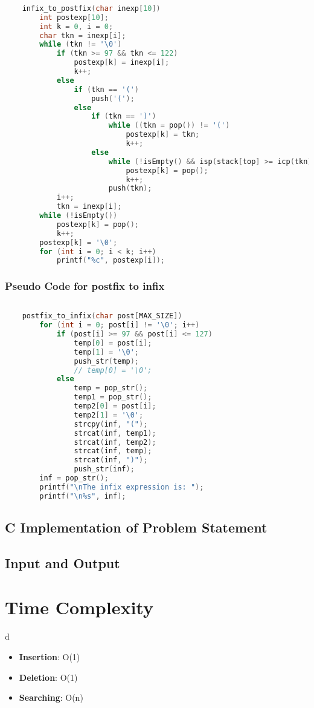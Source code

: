 \documentclass[11pt]{article}
\begin{document}
\begin{lstlisting}[language=C]
	
	infix_to_postfix(char inexp[10])
		int postexp[10];
		int k = 0, i = 0;
		char tkn = inexp[i];
		while (tkn != '\0')
			if (tkn >= 97 && tkn <= 122)
				postexp[k] = inexp[i];
				k++;
			else
				if (tkn == '(')
					push('(');
				else
					if (tkn == ')')
						while ((tkn = pop()) != '(')
							postexp[k] = tkn;
							k++;
					else
						while (!isEmpty() && isp(stack[top] >= icp(tkn)))
							postexp[k] = pop();
							k++;
						push(tkn);
			i++;
			tkn = inexp[i];
		while (!isEmpty())
			postexp[k] = pop();
			k++;
		postexp[k] = '\0';
		for (int i = 0; i < k; i++)
			printf("%c", postexp[i]);
\end{lstlisting}\subsubsection{Pseudo Code for postfix to infix}

\begin{lstlisting}[language=C]
	
	postfix_to_infix(char post[MAX_SIZE])
		for (int i = 0; post[i] != '\0'; i++)
			if (post[i] >= 97 && post[i] <= 127)
				temp[0] = post[i];
				temp[1] = '\0';
				push_str(temp);
				// temp[0] = '\0';
			else
				temp = pop_str();
				temp1 = pop_str();
				temp2[0] = post[i];
				temp2[1] = '\0';
				strcpy(inf, "(");
				strcat(inf, temp1);
				strcat(inf, temp2);
				strcat(inf, temp);
				strcat(inf, ")");
				push_str(inf);
		inf = pop_str();
		printf("\nThe infix expression is: ");
		printf("\n%s", inf);
\end{lstlisting}
\subsection{C Implementation of Problem Statement}



\subsection{Input and Output}


\section{Time Complexity}d
\begin{itemize}
	\item \textbf{Insertion}: O(1)
	\item \textbf{Deletion}: O(1)
	\item \textbf{Searching}: O(n)
\end{itemize}
\end{document}
